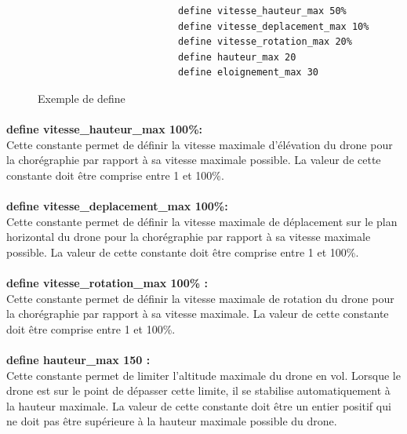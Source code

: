 \documentclass[12pt]{article}
\begin{document}
			\begin{figure}[h!]
  			      \begin{center}
  			          \begin{verbatim}
   			             define vitesse_hauteur_max 50%
   			             define vitesse_deplacement_max 10%
   			             define vitesse_rotation_max 20%
   			             define hauteur_max 20
   			             define eloignement_max 30
   			         \end{verbatim}
   			     \end{center}
    			    \caption{Exemple de define}
    			    \label{Exemple de define}
   			 \end{figure}

			\paragraph{}\textbf{define vitesse\_hauteur\_max 100\%: } \\
				Cette constante permet de définir la vitesse maximale d'élévation du drone pour la chorégraphie par rapport à sa vitesse maximale possible. \newline
				La valeur de cette constante doit être comprise entre 1 et 100\%.
			\paragraph{}\textbf{define vitesse\_deplacement\_max 100\%:}\\
				Cette constante permet de définir la vitesse maximale de déplacement sur le plan horizontal du drone pour la chorégraphie par rapport à sa vitesse maximale possible. \newline
				La valeur de cette constante doit être comprise entre 1 et 100\%.
			\paragraph{}\textbf{define vitesse\_rotation\_max 100\% :}\\
				Cette constante permet de définir la vitesse maximale de rotation du drone pour la chorégraphie par rapport à sa vitesse maximale. \newline
				La valeur de cette constante doit être comprise entre 1 et 100\%.
			\paragraph{}\textbf{define hauteur\_max 150 :}\\
				Cette constante permet de limiter l'altitude maximale du drone en vol. Lorsque le drone est sur le point de dépasser cette limite, il se stabilise automatiquement à la hauteur maximale. \newline
				La valeur de cette constante doit être un entier positif qui ne doit pas être supérieure à la hauteur maximale possible du drone.
\end{document}
